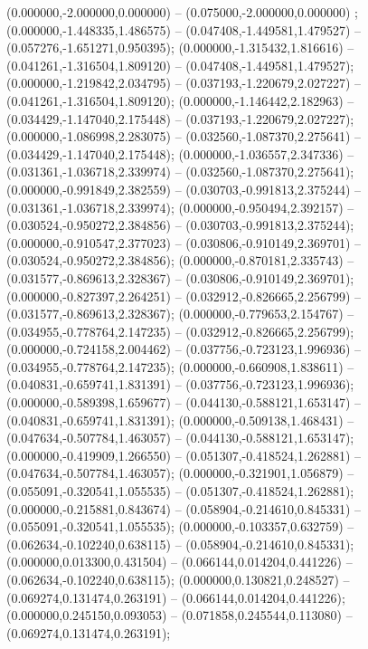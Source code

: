  (0.000000,-2.000000,0.000000) -- (0.075000,-2.000000,0.000000) ;
 (0.000000,-1.448335,1.486575) -- (0.047408,-1.449581,1.479527) -- (0.057276,-1.651271,0.950395);
 (0.000000,-1.315432,1.816616) -- (0.041261,-1.316504,1.809120) -- (0.047408,-1.449581,1.479527);
 (0.000000,-1.219842,2.034795) -- (0.037193,-1.220679,2.027227) -- (0.041261,-1.316504,1.809120);
 (0.000000,-1.146442,2.182963) -- (0.034429,-1.147040,2.175448) -- (0.037193,-1.220679,2.027227);
 (0.000000,-1.086998,2.283075) -- (0.032560,-1.087370,2.275641) -- (0.034429,-1.147040,2.175448);
 (0.000000,-1.036557,2.347336) -- (0.031361,-1.036718,2.339974) -- (0.032560,-1.087370,2.275641);
 (0.000000,-0.991849,2.382559) -- (0.030703,-0.991813,2.375244) -- (0.031361,-1.036718,2.339974);
 (0.000000,-0.950494,2.392157) -- (0.030524,-0.950272,2.384856) -- (0.030703,-0.991813,2.375244);
 (0.000000,-0.910547,2.377023) -- (0.030806,-0.910149,2.369701) -- (0.030524,-0.950272,2.384856);
 (0.000000,-0.870181,2.335743) -- (0.031577,-0.869613,2.328367) -- (0.030806,-0.910149,2.369701);
 (0.000000,-0.827397,2.264251) -- (0.032912,-0.826665,2.256799) -- (0.031577,-0.869613,2.328367);
 (0.000000,-0.779653,2.154767) -- (0.034955,-0.778764,2.147235) -- (0.032912,-0.826665,2.256799);
 (0.000000,-0.724158,2.004462) -- (0.037756,-0.723123,1.996936) -- (0.034955,-0.778764,2.147235);
 (0.000000,-0.660908,1.838611) -- (0.040831,-0.659741,1.831391) -- (0.037756,-0.723123,1.996936);
 (0.000000,-0.589398,1.659677) -- (0.044130,-0.588121,1.653147) -- (0.040831,-0.659741,1.831391);
 (0.000000,-0.509138,1.468431) -- (0.047634,-0.507784,1.463057) -- (0.044130,-0.588121,1.653147);
 (0.000000,-0.419909,1.266550) -- (0.051307,-0.418524,1.262881) -- (0.047634,-0.507784,1.463057);
 (0.000000,-0.321901,1.056879) -- (0.055091,-0.320541,1.055535) -- (0.051307,-0.418524,1.262881);
 (0.000000,-0.215881,0.843674) -- (0.058904,-0.214610,0.845331) -- (0.055091,-0.320541,1.055535);
 (0.000000,-0.103357,0.632759) -- (0.062634,-0.102240,0.638115) -- (0.058904,-0.214610,0.845331);
 (0.000000,0.013300,0.431504) -- (0.066144,0.014204,0.441226) -- (0.062634,-0.102240,0.638115);
 (0.000000,0.130821,0.248527) -- (0.069274,0.131474,0.263191) -- (0.066144,0.014204,0.441226);
 (0.000000,0.245150,0.093053) -- (0.071858,0.245544,0.113080) -- (0.069274,0.131474,0.263191);
